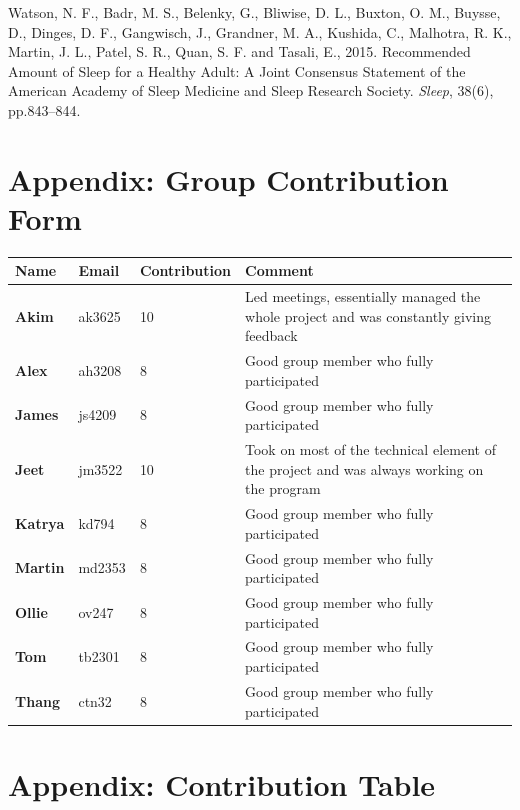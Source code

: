 \documentclass[12pt]{article}
\begin{document}
\begin{thebibliography}{99}
    Watson, N. F., Badr, M. S., Belenky, G., Bliwise, D. L., Buxton, O. M., Buysse, D., 
    Dinges, D. F., Gangwisch, J., Grandner, M. A., Kushida, C., Malhotra, R. K., Martin, J. L., Patel, S. R., 
    Quan, S. F. and Tasali, E., 2015. 
    Recommended Amount of Sleep for a Healthy Adult: 
    A Joint Consensus Statement of the American Academy of Sleep Medicine and Sleep Research Society. 
    \textit{Sleep}, 38(6), pp.843–844.
\end{thebibliography}


\newpage
\section{Appendix: Group Contribution Form}

\begin{table}[!ht]
\centering
\begin{tabular}{|p{1.5cm}|p{1.5cm}|p{3cm}|p{6cm}|}
\hline
\textbf{Name} & \textbf{Email} & \textbf{Contribution} & \textbf{Comment} \\
\hline
\textbf{Akim} &  ak3625 & 10 & Led meetings, essentially managed the whole project and was constantly giving feedback  \\
\hline
\textbf{Alex} & ah3208 & 8 & Good group member who fully participated \\
\hline
\textbf{James} & js4209 & 8 & Good group member who fully participated\\
\hline
\textbf{Jeet} & jm3522 & 10 & Took on most of the technical element of the project and was always working on the program\\
\hline
\textbf{Katrya} & kd794 & 8 & Good group member who fully participated\\
\hline
\textbf{Martin} & md2353 & 8 & Good group member who fully participated \\
\hline
\textbf{Ollie} & ov247 & 8 & Good group member who fully participated\\
\hline
\textbf{Tom} & tb2301 & 8 & Good group member who fully participated\\
\hline
\textbf{Thang} & ctn32 & 8 & Good group member who fully participated\\
\hline
\end{tabular}
\end{table}

\newpage
\section{Appendix: Contribution Table}
\end{document}
